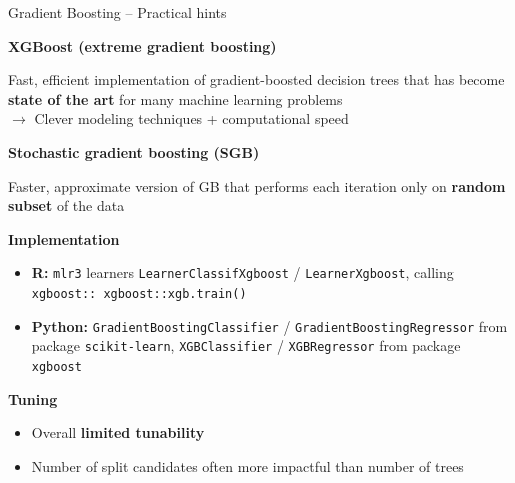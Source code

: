 \documentclass[11pt,compress,t,notes=noshow, xcolor=table]{beamer}
\newcommand{\highlight}[1]{\textcolor{highlightcol}{\textbf{#1}}}
\let\code=\texttt
\begin{document}
\begin{frame}{Gradient Boosting -- Practical hints}

\footnotesize

\highlight{XGBoost (extreme gradient boosting)} 

Fast, efficient implementation of gradient-boosted decision trees that has
become \textbf{state of the art} for many machine learning problems \\
$\rightarrow$ Clever modeling techniques + computational speed \\

\medskip

\highlight{Stochastic gradient boosting (SGB)}

Faster, approximate version of GB that performs each iteration only on 
\textbf{random subset} of the data \\

\medskip

\highlight{Implementation}

\begin{itemize}
  \item \textbf{R:} \code{mlr3} learners \code{LearnerClassifXgboost} / 
  \code{LearnerXgboost}, calling \code{xgboost:: xgboost::xgb.train()}
  \item \textbf{Python:} \code{GradientBoostingClassifier} / 
  \code{GradientBoostingRegressor} from package \code{scikit-learn}, 
  \code{XGBClassifier} / \code{XGBRegressor} from package \code{xgboost}
\end{itemize}

\medskip

\highlight{Tuning}
\begin{itemize}
  \item Overall \textbf{limited tunability}
  \item Number of split candidates often more impactful than number of trees
\end{itemize}

\end{frame}

\end{document}
